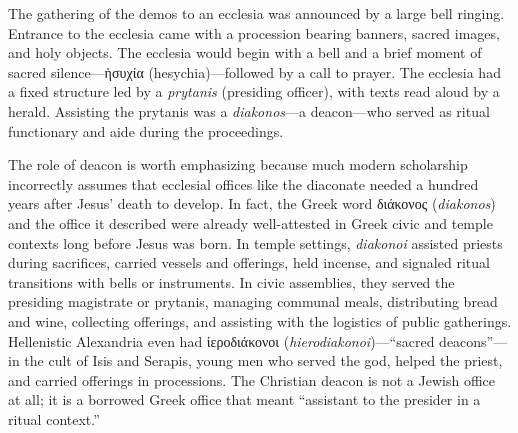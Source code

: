 The gathering of the demos to an ecclesia was announced by a large bell ringing.
Entrance to the ecclesia came with a procession bearing banners, sacred images, and holy objects.
The ecclesia would begin with a bell and a brief moment of sacred silence---ἡσυχία (hesychia)---followed by a call to prayer.
The ecclesia had a fixed structure led by a \emph{prytanis} (presiding officer), with texts read aloud by a herald.
Assisting the prytanis was a \emph{diakonos}---a deacon---who served as ritual functionary and aide during the proceedings.

The role of deacon is worth emphasizing because much modern scholarship incorrectly assumes that ecclesial offices like the diaconate needed a hundred years after Jesus' death to develop.
In fact, the Greek word διάκονος (\emph{diakonos}) and the office it described were already well-attested in Greek civic and temple contexts long before Jesus was born.
In temple settings, \emph{diakonoi} assisted priests during sacrifices, carried vessels and offerings, held incense, and signaled ritual transitions with bells or instruments.
In civic assemblies, they served the presiding magistrate or prytanis, managing communal meals, distributing bread and wine, collecting offerings, and assisting with the logistics of public gatherings.
Hellenistic Alexandria even had ἱεροδιάκονοι (\textit{hierodiakonoi})---``sacred deacons''---in the cult of Isis and Serapis, young men who served the god, helped the priest, and carried offerings in processions.
The Christian deacon is not a Jewish office at all; it is a borrowed Greek office that meant ``assistant to the presider in a ritual context.''

